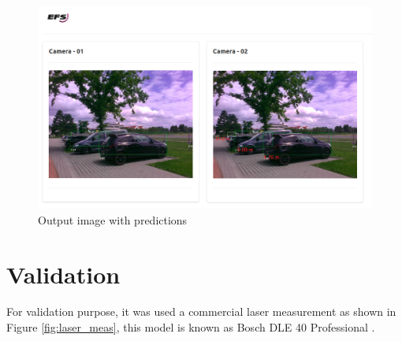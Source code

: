 
\begin{figure}[H]
\centering
\includegraphics[scale=0.8]{imagens/output_framework.png}
\caption{Output image with predictions }
\label{fig:framework_predict}
\end{figure}



\section{Validation}

For validation purpose, it was used a commercial laser measurement as shown in Figure \ref{fig:laser_meas}, this model is known as Bosch DLE 40 Professional {\tiny{\textregistered}}. 



